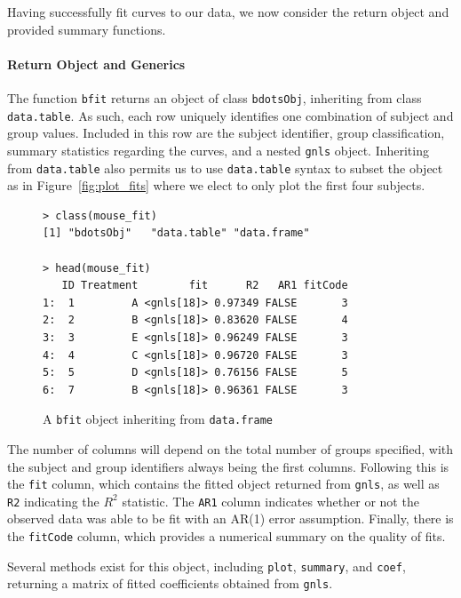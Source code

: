 \documentclass{article}
\newcommand{\xt}{\texttt}%
\begin{document}
Having successfully fit curves to our data, we now consider the return object and provided summary functions. 


\paragraph{Return Object and Generics}

The function \xt{bfit} returns an object of class \xt{bdotsObj}, inheriting from class \xt{data.table}. As such, each row uniquely identifies one combination of subject and group values. Included in this row are the subject identifier, group classification, summary statistics regarding the curves, and a nested \xt{gnls} object. Inheriting from \xt{data.table} also permits us to use \xt{data.table} syntax to subset the object as in Figure~\ref{fig:plot_fits}  where we elect to only plot the first four subjects.

\begin{singlespace}
\begin{figure}[H]
\centering
\begin{BVerbatim}
> class(mouse_fit)
[1] "bdotsObj"   "data.table" "data.frame"

> head(mouse_fit)
   ID Treatment        fit      R2   AR1 fitCode
1:  1         A <gnls[18]> 0.97349 FALSE       3
2:  2         B <gnls[18]> 0.83620 FALSE       4
3:  3         E <gnls[18]> 0.96249 FALSE       3
4:  4         C <gnls[18]> 0.96720 FALSE       3
5:  5         D <gnls[18]> 0.76156 FALSE       5
6:  7         B <gnls[18]> 0.96361 FALSE       3
\end{BVerbatim}
\caption{A \xt{bfit} object inheriting from \xt{data.frame}}
\label{fig:bdotsObj}
\end{figure}
\end{singlespace}

The number of columns will depend on the total number of groups specified, with the subject and group identifiers always being the first columns. Following this is the \xt{fit} column, which contains the fitted object returned from \xt{gnls}, as well as \xt{R2} indicating the $R^2$ statistic. The \xt{AR1} column indicates whether or not the observed data was able to be fit with an AR(1) error assumption. Finally, there is the \xt{fitCode} column, which provides a numerical summary on the quality of fits.

Several methods exist for this object, including \xt{plot}, \xt{summary}, and \xt{coef}, returning a matrix of fitted coefficients obtained from \xt{gnls}. 
\end{document}
